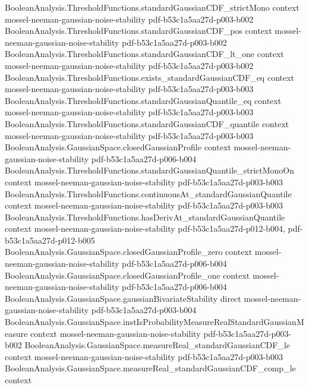 \begin{lemma}
\proofstep
  {BooleanAnalysis.ThresholdFunctions.standardGaussianCDF_strictMono}
  {context}
  {mossel-neeman-gaussian-noise-stability}
  {pdf-b53c1a5aa27d-p003-b002}
\proofstep
  {BooleanAnalysis.ThresholdFunctions.standardGaussianCDF_pos}
  {context}
  {mossel-neeman-gaussian-noise-stability}
  {pdf-b53c1a5aa27d-p003-b002}
\proofstep
  {BooleanAnalysis.ThresholdFunctions.standardGaussianCDF_lt_one}
  {context}
  {mossel-neeman-gaussian-noise-stability}
  {pdf-b53c1a5aa27d-p003-b002}
\proofstep
  {BooleanAnalysis.ThresholdFunctions.exists_standardGaussianCDF_eq}
  {context}
  {mossel-neeman-gaussian-noise-stability}
  {pdf-b53c1a5aa27d-p003-b003}
\proofstep
  {BooleanAnalysis.ThresholdFunctions.standardGaussianQuantile_eq}
  {context}
  {mossel-neeman-gaussian-noise-stability}
  {pdf-b53c1a5aa27d-p003-b003}
\proofstep
  {BooleanAnalysis.ThresholdFunctions.standardGaussianCDF_quantile}
  {context}
  {mossel-neeman-gaussian-noise-stability}
  {pdf-b53c1a5aa27d-p003-b003}
\proofstep
  {BooleanAnalysis.GaussianSpace.closedGaussianProfile}
  {context}
  {mossel-neeman-gaussian-noise-stability}
  {pdf-b53c1a5aa27d-p006-b004}
\proofstep
  {BooleanAnalysis.ThresholdFunctions.standardGaussianQuantile_strictMonoOn}
  {context}
  {mossel-neeman-gaussian-noise-stability}
  {pdf-b53c1a5aa27d-p003-b003}
\proofstep
  {BooleanAnalysis.ThresholdFunctions.continuousAt_standardGaussianQuantile}
  {context}
  {mossel-neeman-gaussian-noise-stability}
  {pdf-b53c1a5aa27d-p003-b003}
\proofstep
  {BooleanAnalysis.ThresholdFunctions.hasDerivAt_standardGaussianQuantile}
  {context}
  {mossel-neeman-gaussian-noise-stability}
  {pdf-b53c1a5aa27d-p012-b004,
    pdf-b53c1a5aa27d-p012-b005}
\proofstep
  {BooleanAnalysis.GaussianSpace.closedGaussianProfile_zero}
  {context}
  {mossel-neeman-gaussian-noise-stability}
  {pdf-b53c1a5aa27d-p006-b004}
\proofstep
  {BooleanAnalysis.GaussianSpace.closedGaussianProfile_one}
  {context}
  {mossel-neeman-gaussian-noise-stability}
  {pdf-b53c1a5aa27d-p006-b004}
\proofstep
  {BooleanAnalysis.GaussianSpace.gaussianBivariateStability}
  {direct}
  {mossel-neeman-gaussian-noise-stability}
  {pdf-b53c1a5aa27d-p003-b004}
\proofstep
  {BooleanAnalysis.GaussianSpace.instIsProbabilityMeasureRealStandardGaussianMeasure}
  {context}
  {mossel-neeman-gaussian-noise-stability}
  {pdf-b53c1a5aa27d-p003-b002}
\proofstep
  {BooleanAnalysis.GaussianSpace.measureReal_standardGaussianCDF_le}
  {context}
  {mossel-neeman-gaussian-noise-stability}
  {pdf-b53c1a5aa27d-p003-b003}
\proofstep
  {BooleanAnalysis.GaussianSpace.measureReal_standardGaussianCDF_comp_le}
  {context}

\end{lemma}
